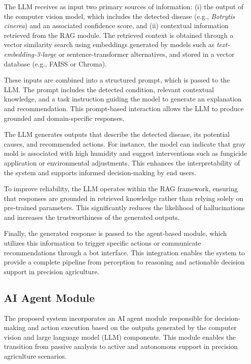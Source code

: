\documentclass[11pt]{article}
\begin{document}
The LLM receives as input two primary sources of information: (i) the output of the computer vision model, which includes the detected disease (e.g., \textit{Botrytis cinerea}) and an associated confidence score, and (ii) contextual information retrieved from the RAG module. The retrieved context is obtained through a vector similarity search using embeddings generated by models such as \textit{text-embedding-3-large} or sentence-transformer alternatives, and stored in a vector database (e.g., FAISS or Chroma).

These inputs are combined into a structured prompt, which is passed to the LLM. The prompt includes the detected condition, relevant contextual knowledge, and a task instruction guiding the model to generate an explanation and recommendation. This prompt-based interaction allows the LLM to produce grounded and domain-specific responses.

The LLM generates outputs that describe the detected disease, its potential causes, and recommended actions. For instance, the model can indicate that gray mold is associated with high humidity and suggest interventions such as fungicide application or environmental adjustments. This enhances the interpretability of the system and supports informed decision-making by end users.

To improve reliability, the LLM operates within the RAG framework, ensuring that responses are grounded in retrieved knowledge rather than relying solely on pre-trained parameters. This significantly reduces the likelihood of hallucinations and increases the trustworthiness of the generated outputs.

Finally, the generated response is passed to the agent-based module, which utilizes this information to trigger specific actions or communicate recommendations through a bot interface. This integration enables the system to provide a complete pipeline from perception to reasoning and actionable decision support in precision agriculture.

\subsection{AI Agent Module}
The proposed system incorporates an AI agent module responsible for decision-making and action execution based on the outputs generated by the computer vision and large language model (LLM) components. This module enables the transition from passive analysis to active and autonomous support in precision agriculture scenarios.
\end{document}
